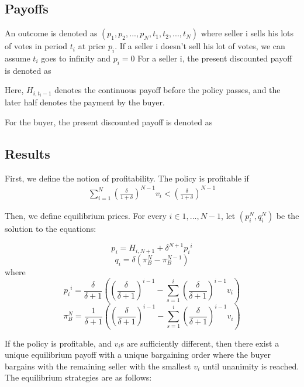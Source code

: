 \documentclass[ProjectGAZ]{subfiles}
\begin{document}
\subsection{Payoffs}\label{subsec:Xiao-Payoff}

An outcome is denoted as $(p_1, p_2, ..., p_N, t_1, t_2, ..., t_N)$ where seller i sells his lots of votes in period $t_i$ at price $p_i$. If a seller i doesn't sell his lot of votes, we can assume $t_i$ goes to infinity and $p_i= 0$  For a seller i, the present discounted payoff is denoted as



Here, $H_{i, t_i-1}$ denotes the continuous payoff before the policy passes, and the later half denotes the payment by the buyer.

For the buyer, the present discounted payoff is denoted as 



\subsection{Results}\label{subsec:Xiao-Results}

First, we define the notion of profitability. The policy is profitable if 
\begin{align}
	\sum_{i=1}^{N} (\frac{\delta}{1+\delta})^{N-1} v_i < (\frac{\delta}{1+\delta})^{N-1} \label{eq:XiaoProfitable}
\end{align}

Then, we define equilibrium prices. For every $i \in {1, ..., N-1}$, let $(p_i^N, q_i^N)$ be the solution to the equations:

\begin{equation}
	p_i = H_{i, N+1} + \delta^{N+1}{p_i}^i 
\end{equation}
\begin{equation}
	q_i = \delta(\pi_B^{N} - \pi_B^{N-1})
\end{equation}
where 
\begin{equation}
	{p_i}^i = \frac{\delta}{\delta+1}((\frac{\delta}{\delta+1})^{i-1} - \sum_{s=1}^{i}(\frac{\delta}{\delta +1})^{i-1}v_i)
\end{equation}
\begin{equation}
	\pi_B^N = \frac{1}{\delta+1}((\frac{\delta}{\delta+1})^{i-1} - \sum_{s=1}^{i}(\frac{\delta}{\delta +1})^{i-1}v_i)
\end{equation}

If the policy is profitable, and $v_i$s are sufficiently different, then there exist a unique equilibrium payoff with a unique bargaining order where the buyer bargains with the remaining seller with the smallest $v_i$ until unanimity is reached. The equilibrium strategies are as follows:
\end{document}
